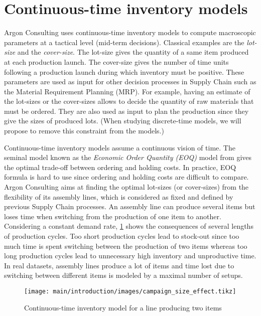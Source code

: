 \section{Continuous-time inventory models}
\label{sec:intro:en:continuous-time-inventory-models}


Argon Consulting uses continuous-time inventory models to compute macroscopic parameters at a tactical level (mid-term decisions).
Classical examples are the \emph{lot-size} and the \emph{cover-size}.
The lot-size gives the quantity of a same item produced at each production launch.
The cover-size gives the number of time units following a production launch during which inventory must be positive.
These parameters are used as input for other decision processes in Supply Chain such as the Material Requirement Planning (MRP).
For example, having an estimate of the lot-sizes or the cover-sizes allows to decide the quantity of raw materials that must be ordered.
They are also used as input to plan the production since they give the sizes of produced lots.
(When studying discrete-time models, we will propose to remove this constraint from the models.)


Continuous-time inventory models assume a continuous vision of time.
The seminal model known as the \emph{Economic Order Quantity (EOQ)} model from \citet{Harris1913} gives the optimal trade-off between ordering and holding costs.
In practice, EOQ formula is hard to use since ordering and holding costs are difficult to compare.
Argon Consulting aims at finding the optimal lot-sizes (or cover-sizes) from the flexibility of its assembly lines, which is considered as fixed and defined by previous Supply Chain processes.
An assembly line can produce several items but loses time when switching from the production of one item to another.
Considering a constant demand rate, \cref{fig:intro:en:continuous-time-inventory-model} shows the consequences of several lengths of production cycles.
Too short production cycles lead to stock-out since too much time is spent switching between the production of two items whereas too long production cycles lead to unnecessary high inventory and unproductive time.
In real datasets, assembly lines produce a lot of items and time lost due to switching between different items is modeled by a maximal number of setups.


\begin{figure}[!ht]
  \centering
  \texttt{[image: main/introduction/images/campaign\_size\_effect.tikz]}
  \caption{Continuous-time inventory model for a line producing two items}
  \label{fig:intro:en:continuous-time-inventory-model}
\end{figure}


